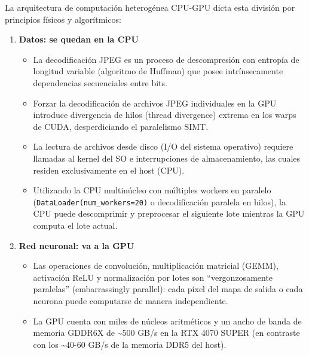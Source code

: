 \documentclass[
  11pt,
]{article}
\providecommand{\tightlist}{%
  \setlength{\itemsep}{0pt}\setlength{\parskip}{0pt}}
\begin{document}
La arquitectura de computación heterogénea CPU-GPU dicta
esta división por principios físicos y algorítmicos:

\begin{enumerate}
\def\labelenumi{\arabic{enumi}.}
\tightlist
\item
  \textbf{Datos: se quedan en la CPU}

  \begin{itemize}
  \tightlist
  \item
    La decodificación JPEG es un proceso de descompresión
    con entropía de longitud variable (algoritmo de Huffman)
    que posee intrínsecamente dependencias secuenciales
    entre bits.
  \item
    Forzar la decodificación de archivos JPEG individuales
    en la GPU introduce divergencia de hilos (thread
    divergence) extrema en los warps de CUDA, desperdiciando
    el paralelismo SIMT.
  \item
    La lectura de archivos desde disco (I/O del sistema
    operativo) requiere llamadas al kernel del SO e
    interrupciones de almacenamiento, las cuales residen
    exclusivamente en el host (CPU).
  \item
    Utilizando la CPU multinúcleo con múltiples workers en
    paralelo (\texttt{DataLoader(num\_workers=20)} o
    decodificación paralela en hilos), la CPU puede
    descomprimir y preprocesar el siguiente lote mientras la
    GPU computa el lote actual.
  \end{itemize}
\item
  \textbf{Red neuronal: va a la GPU}

  \begin{itemize}
  \tightlist
  \item
    Las operaciones de convolución, multiplicación matricial
    (GEMM), activación ReLU y normalización por lotes son
    ``vergonzosamente paralelas'' (embarrassingly
    parallel): cada píxel del mapa de salida o cada neurona
    puede computarse de manera independiente.
  \item
    La GPU cuenta con miles de núcleos aritméticos y un
    ancho de banda de memoria GDDR6X de \textasciitilde500
    GB/s en la RTX 4070 SUPER (en contraste con los
    \textasciitilde40-60 GB/s de la memoria DDR5 del host).
  \end{itemize}
\end{enumerate}
\end{document}
